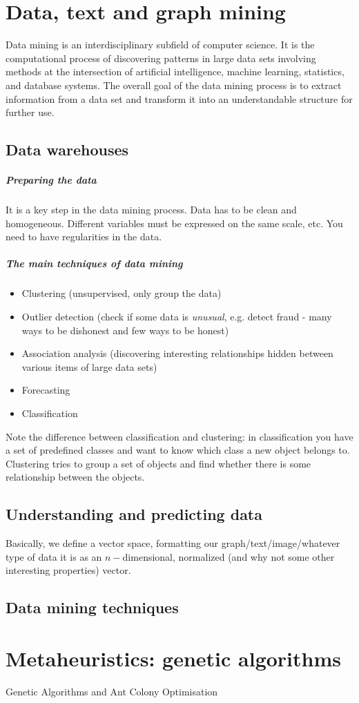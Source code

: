 \chapter{Data, text and graph mining}
Data mining is an interdisciplinary subfield of computer science. It is the computational process of discovering patterns in large data sets involving methods at the intersection of artificial intelligence, machine learning, statistics, and database systems. The overall goal of the data mining process is to extract information from a data set and transform it into an understandable structure for further use.
\section{Data warehouses}
\paragraph{Preparing the data} It is a key step in the data mining process. Data has to be clean and homogeneous. Different variables must be expressed on the same scale, etc. You need to have regularities in the data.

\paragraph{The main techniques of data mining}
\begin{itemize}
    \item Clustering (unsupervised, only group the data)
    \item Outlier detection (check if some data is \textit{unusual}, e.g. detect fraud - many ways to be dishonest and few ways to be honest)
    \item Association analysis (discovering interesting relationships hidden between various items of large data sets)
    \item Forecasting
    \item Classification
\end{itemize}
Note the difference between classification and clustering: in classification you have a set of predefined classes and want to know which class a new object belongs to. Clustering tries to group a set of objects and find whether there is some relationship between the objects.

\section{Understanding and predicting data}
Basically, we define a vector space, formatting our graph/text/image/whatever type of data it is as an $n-$dimensional, normalized (and why not some other interesting properties) vector.
\section{Data mining techniques}

\chapter{Metaheuristics: genetic algorithms}
Genetic Algorithms and Ant Colony Optimisation